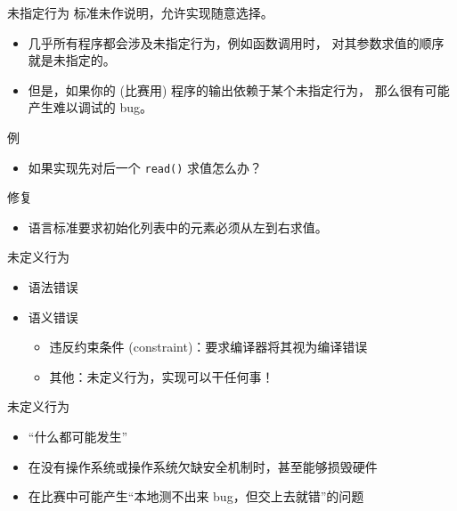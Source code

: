 \documentclass[10pt,mathserif]{beamer}
\newcommand{\lstcode}[1] {  }
\begin{document}
\begin{frame}{未指定行为}
	标准未作说明，允许实现随意选择。
	\begin{itemize}
		\item 几乎所有程序都会涉及未指定行为，例如函数调用时，
			对其参数求值的顺序就是未指定的。
		\item 但是，如果你的 (比赛用) 程序的输出依赖于某个未指定行为，
			那么很有可能产生难以调试的 bug。
	\end{itemize}
\end{frame}

\begin{frame}[fragile]{例}
	\lstcode{unspecified.cc}
	\begin{itemize}
		\item 如果实现先对后一个 \lstinline{read()} 求值怎么办？
	\end{itemize}
\end{frame}

\begin{frame}[fragile]{修复}
	\lstcode{unspecified-fix.cc}
	\begin{itemize}
		\item 语言标准要求初始化列表中的元素必须从左到右求值。
	\end{itemize}
\end{frame}

\begin{frame}{未定义行为}
	\begin{itemize}
		\item 语法错误
		\item 语义错误
			\begin{itemize}
				\item 违反约束条件 (constraint)：要求编译器将其视为编译错误
				\item 其他：未定义行为，实现可以干任何事！
			\end{itemize}
	\end{itemize}
\end{frame}

\begin{frame}{未定义行为}
	\begin{itemize}
		\item “什么都可能发生”
		\item 在没有操作系统或操作系统欠缺安全机制时，甚至能够损毁硬件
		\item 在比赛中可能产生“本地测不出来 bug，但交上去就错”的问题
	\end{itemize}
\end{frame}
\end{document}
